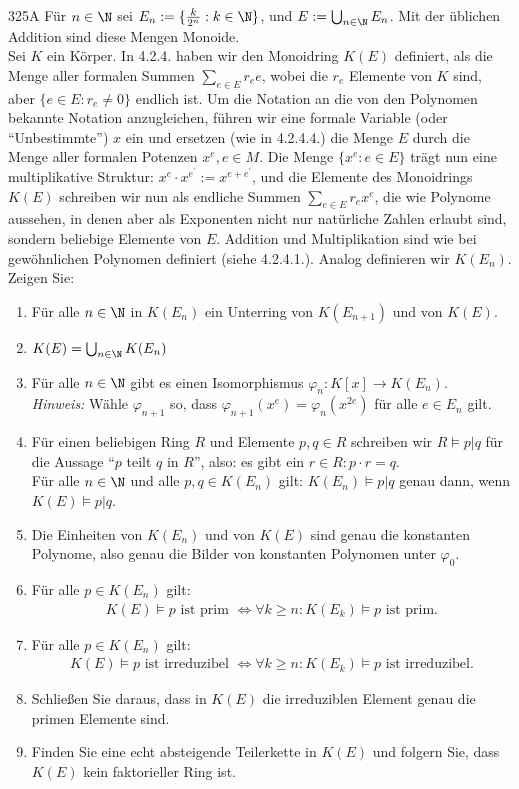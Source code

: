 \begin{algebraUE}{325A}
Für $n \in \N$ sei $E_n := \{\frac{k}{2^n}: k \in \N\}$, und $E := \bigcup_{n \in \N}E_n$.
Mit der üblichen Addition sind diese Mengen Monoide. \\
Sei $K$ ein Körper. In 4.2.4. haben wir den Monoidring $K(E)$ definiert, als die
Menge aller formalen Summen $\sum_{e \in E}r_ee$, wobei die $r_e$ Elemente von $K$
sind, aber $\{e \in E: r_e \neq 0\}$ endlich ist. Um die Notation an die von den
Polynomen bekannte Notation anzugleichen, führen wir eine formale Variable
(oder ``Unbestimmte'') $x$ ein und ersetzen (wie in 4.2.4.4.) die Menge $E$
durch die Menge aller formalen Potenzen $x^e,e \in M$. Die Menge $\{x^e : e \in E\}$
trägt nun eine multiplikative Struktur: $x^e\cdot x^{e^{\prime}} := x^{e+e^{\prime}}$,
und die Elemente des Monoidrings $K(E)$ schreiben wir nun als endliche Summen
$\sum_{e \in E}r_e x^e$, die wie Polynome aussehen, in denen aber als Exponenten
nicht nur natürliche Zahlen erlaubt sind, sondern beliebige Elemente von $E$.
Addition und Multiplikation sind wie bei gewöhnlichen Polynomen definiert
(siehe 4.2.4.1.). Analog definieren wir $K(E_n)$. Zeigen Sie:
\begin{enumerate}
  \item Für alle $n \in \N$ in $K(E_n)$ ein Unterring von $K(E_{n+1})$ und von
  $K(E)$.
  \item $K(E) = \bigcup_{n \in \N}K(E_n)$
  \item Für alle $n \in \N$ gibt es einen Isomorphismus $\varphi_n: K[x] \to K(E_n)$. \\
  \textit{Hinweis:} Wähle $\varphi_{n+1}$ so, dass $\varphi_{n+1}(x^e) = \varphi_{n}(x^{2e})$
  für alle $e \in E_n$ gilt.
  \item Für einen beliebigen Ring $R$ und Elemente $p,q \in R$ schreiben wir $R \vDash p|q$
  für die Aussage ``$p$ teilt $q$ in $R$'', also: es gibt ein $r \in R: p\cdot r = q$. \\
  Für alle $n \in \N$ und alle $p,q \in K(E_n)$ gilt: $K(E_n) \vDash p|q$
  genau dann, wenn $K(E) \vDash p|q$.
  \item Die Einheiten von $K(E_n)$ und von $K(E)$ sind genau die konstanten Polynome,
  also genau die Bilder von konstanten Polynomen unter $\varphi_0$.
  \item Für alle $p \in K(E_n)$ gilt:
  \begin{align*}
    K(E) \vDash p \text{ ist prim } \iff \forall k \geq n: K(E_k) \vDash p \text{ ist prim}.
  \end{align*}
  \item Für alle $p \in K(E_n)$ gilt:
  \begin{align*}
    K(E) \vDash p \text{ ist irreduzibel } \iff \forall k \geq n: K(E_k) \vDash p \text{ ist irreduzibel}.
  \end{align*}
  \item Schließen Sie daraus, dass in $K(E)$ die irreduziblen Element genau die primen Elemente sind.
  \item Finden Sie eine echt absteigende Teilerkette in $K(E)$ und folgern Sie, dass $K(E)$
  kein faktorieller Ring ist.
\end{enumerate}
\end{algebraUE}
